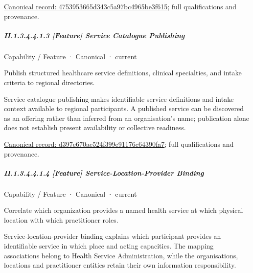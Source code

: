 {\footnotesize \href{../../../../continuum/strategy/capability/feature/4753953665d343c5a97bc4965be3f615.md}{Canonical record: 4753953665d343c5a97bc4965be3f615}; full qualifications and provenance.}\par
\subparagraph*{II.1.3.4.4.1.3 [Feature] Service Catalogue Publishing}
\label{navigation:II.1.3.4.4.1.3}

\label{element:d397e670ae524f399e91176c64390fa7}
{\small Capability / Feature · Canonical · current}\par

Publish structured healthcare service definitions, clinical specialties, and intake criteria to regional directories.



Service catalogue publishing makes identifiable service definitions and intake context available to regional participants. A published service can be discovered as an offering rather than inferred from an organisation's name; publication alone does not establish present availability or collective readiness.


{\footnotesize \href{../../../../continuum/strategy/capability/feature/d397e670ae524f399e91176c64390fa7.md}{Canonical record: d397e670ae524f399e91176c64390fa7}; full qualifications and provenance.}\par
\subparagraph*{II.1.3.4.4.1.4 [Feature] Service-Location-Provider Binding}
\label{navigation:II.1.3.4.4.1.4}

\label{element:37188bb916244f41b1b7d988ad52a2eb}
{\small Capability / Feature · Canonical · current}\par

Correlate which organization provides a named health service at which physical location with which practitioner roles.



Service-location-provider binding explains which participant provides an identifiable service in which place and acting capacities. The mapping associations belong to Health Service Administration, while the organisations, locations and practitioner entities retain their own information responsibility.


